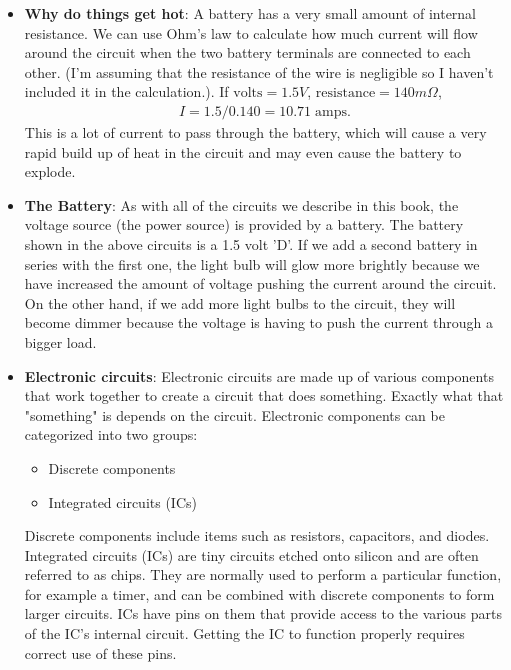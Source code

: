 \documentclass{report}
\begin{document}
\begin{itemize}
        \item \textbf{Why do things get hot}: A battery has a very small amount of internal resistance. We can use Ohm's law to calculate how much current will flow around the circuit when the two battery terminals are connected to each other. (I'm assuming that the resistance of the wire is negligible so I haven't included it in the calculation.). If $\text{volts} = 1.5V$, $\text{resistance} = 140m\Omega$,
            \begin{align*}
                I = 1.5 / 0.140 = 10.71\; \text{amps}
            .\end{align*}
            This is a lot of current to pass through the battery, which will cause a very rapid build up of heat in the circuit and may even cause the battery to explode.
        \item \textbf{The Battery}: As with all of the circuits we describe in this book, the voltage source (the power source) is provided by a battery. The battery shown in the above circuits is a 1.5 volt 'D'. If we add a second battery in series with the first one, the light bulb will glow more brightly because we have increased the amount of voltage pushing the current around the circuit.
            \bigbreak \noindent 
            \bigbreak \noindent 
            On the other hand, if we add more light bulbs to the circuit, they will become dimmer because the voltage is having to push the current through a bigger load.
        \item \textbf{Electronic circuits}: Electronic circuits are made up of various components that work together to create a circuit that does something. Exactly what that "something" is depends on the circuit. Electronic components can be categorized into two groups:
            \begin{itemize}
                \item Discrete components
                \item Integrated circuits (ICs)
            \end{itemize}
            Discrete components include items such as resistors, capacitors, and diodes. Integrated circuits (ICs) are tiny circuits etched onto silicon and are often referred to as chips. They are normally used to perform a particular function, for example a timer, and can be combined with discrete components to form larger circuits.
            \bigbreak \noindent 
            ICs have pins on them that provide access to the various parts of the IC's internal circuit. Getting the IC to function properly requires correct use of these pins.

\end{itemize}
\end{document}
